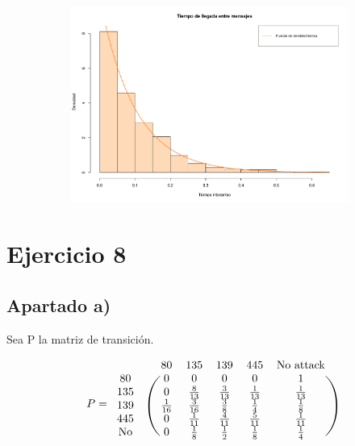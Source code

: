 \documentclass[11pt]{article}
\begin{document}
\begin{figure}[h!]
  \begin{center}
    \begin{subfigure}[b]{\linewidth}
      \includegraphics[width=\linewidth]{densidadTiempoInterarribo.pdf}
    \end{subfigure}
  \end{center}
\end{figure}



\newpage

\section{Ejercicio 8}

\subsection*{Apartado a)}

Sea P la matriz de transición.

\begin{equation*}
  P = 
  \begin{blockarray}{ccccccc}
    & & 80 & 135 & 139 & 445 & \text{No attack} \\
    \begin{block}{cc(ccccc)}
      80        & & 0            & 0            & 0            & 0            & 1 \\
      135       & & 0            & \frac{8}{13} & \frac{3}{13} & \frac{1}{13} & \frac{1}{13} \\
      139       & & \frac{1}{16} & \frac{3}{16} & \frac{3}{8}  & \frac{1}{4}  & \frac{1}{8} \\
      445       & & 0            & \frac{1}{11} & \frac{4}{11} & \frac{5}{11} & \frac{1}{11} \\
      \text{No} & & 0            & \frac{1}{8}  & \frac{1}{2}  & \frac{1}{8}  & \frac{1}{4} \\
    \end{block}
  \end{blockarray}
\end{equation*}
\end{document}
